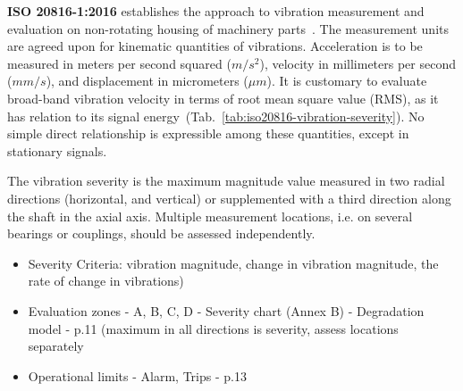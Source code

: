 \textbf{ISO 20816-1:2016} establishes the approach to vibration measurement and evaluation on non-rotating housing of machinery parts~\cite{noauthor_iso_2016}. The measurement units are agreed upon for kinematic quantities of vibrations. Acceleration is to be measured in meters per second squared ($m/s^2$), velocity in millimeters per second ($mm/s$), and displacement in micrometers ($\mu m$). It is customary to evaluate broad-band vibration velocity in terms of root mean square value (RMS), as it has relation to its signal energy~(Tab.~\ref{tab:iso20816-vibration-severity}). No simple direct relationship is expressible among these quantities, except in stationary signals.

The vibration severity is the maximum magnitude value measured in two radial directions (horizontal, and vertical) or supplemented with a third direction along the shaft in the axial axis. Multiple measurement locations, i.e. on several bearings or couplings, should be assessed independently.

\begin{itemize}
\item Severity Criteria: vibration magnitude, change in vibration magnitude, the rate of change in vibrations)
\item Evaluation zones - A, B, C, D - Severity chart (Annex B) - Degradation model - p.11 (maximum in all directions is severity, assess locations separately
\item Operational limits - Alarm, Trips - p.13
\end{itemize}


